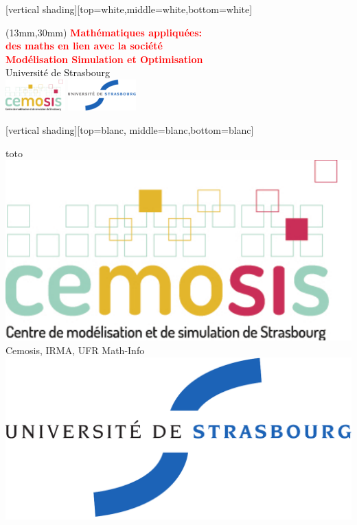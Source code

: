\documentclass[slideopt,A4]{beamer}
\begin{document}
[vertical shading][top=white,middle=white,bottom=white]



\begin{frame}

\begin{textblock*}{15cm}(13mm,30mm)
{\textcolor{red} {
{\huge\bf Mathématiques appliquées: }\\[2mm]
{\huge\bf  des maths en lien avec la société}\\[2mm]
{\bf Modélisation Simulation et Optimisation}\\[8mm] }}
{\textcolor{black} {
	{\Large Université de Strasbourg}\\[2mm]
        \includegraphics[height=1.2cm]{LOGOS/logoCemosis}	\hspace*{40mm}	
        \includegraphics[height=1.2cm]{LOGOS/logoUDS}\\
      }}
\end{textblock*}

\end{frame}



[vertical shading][top=blanc, middle=blanc,bottom=blanc]


{
\begin{beamercolorbox}[wd=1\paperwidth,ht=15.5pt]{toto}
\hspace{-1.6mm}	
  \raisebox{1.2ex}
  {  \includegraphics[height=.6cm]{LOGOS/logoCemosis}}
  \raisebox{2.5ex}
  {Cemosis, IRMA, UFR Math-Info}
\hspace{\fill}	
  \raisebox{2.5ex}
 {  }
  \raisebox{1ex}
{  \colorbox{white}{\includegraphics[height=.6cm]{LOGOS/logoUDS}}}
\end{beamercolorbox} 
}
\end{document}
